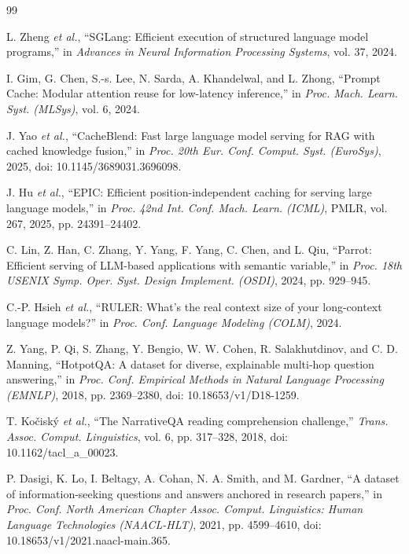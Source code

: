 \begin{thebibliography}{99}

L. Zheng \emph{et al.}, ``SGLang: Efficient execution of structured language model programs,'' in \emph{Advances in Neural Information Processing Systems}, vol. 37, 2024.

I. Gim, G. Chen, S.-s. Lee, N. Sarda, A. Khandelwal, and L. Zhong, ``Prompt Cache: Modular attention reuse for low-latency inference,'' in \emph{Proc. Mach. Learn. Syst. (MLSys)}, vol. 6, 2024.

J. Yao \emph{et al.}, ``CacheBlend: Fast large language model serving for RAG with cached knowledge fusion,'' in \emph{Proc. 20th Eur. Conf. Comput. Syst. (EuroSys)}, 2025, doi: 10.1145/3689031.3696098.

J. Hu \emph{et al.}, ``EPIC: Efficient position-independent caching for serving large language models,'' in \emph{Proc. 42nd Int. Conf. Mach. Learn. (ICML)}, PMLR, vol. 267, 2025, pp. 24391--24402.

C. Lin, Z. Han, C. Zhang, Y. Yang, F. Yang, C. Chen, and L. Qiu, ``Parrot: Efficient serving of LLM-based applications with semantic variable,'' in \emph{Proc. 18th USENIX Symp. Oper. Syst. Design Implement. (OSDI)}, 2024, pp. 929--945.

C.-P. Hsieh \emph{et al.}, ``RULER: What's the real context size of your long-context language models?'' in \emph{Proc. Conf. Language Modeling (COLM)}, 2024.

Z. Yang, P. Qi, S. Zhang, Y. Bengio, W. W. Cohen, R. Salakhutdinov, and C. D. Manning, ``HotpotQA: A dataset for diverse, explainable multi-hop question answering,'' in \emph{Proc. Conf. Empirical Methods in Natural Language Processing (EMNLP)}, 2018, pp. 2369--2380, doi: 10.18653/v1/D18-1259.

T. Ko\v{c}isk\'{y} \emph{et al.}, ``The NarrativeQA reading comprehension challenge,'' \emph{Trans. Assoc. Comput. Linguistics}, vol. 6, pp. 317--328, 2018, doi: 10.1162/tacl\_a\_00023.

P. Dasigi, K. Lo, I. Beltagy, A. Cohan, N. A. Smith, and M. Gardner, ``A dataset of information-seeking questions and answers anchored in research papers,'' in \emph{Proc. Conf. North American Chapter Assoc. Comput. Linguistics: Human Language Technologies (NAACL-HLT)}, 2021, pp. 4599--4610, doi: 10.18653/v1/2021.naacl-main.365.


\end{thebibliography}
